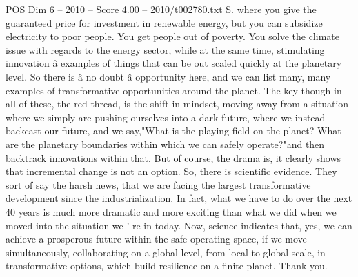 \begin{textsample}{POS Dim 6 – 2010 – Score 4.00 – 2010/t002780.txt}
S. where you give the guaranteed price for investment in renewable energy, but you can subsidize electricity to poor people.
You get people out of poverty.
You solve the climate issue with regards to the energy sector, while at the same time, stimulating innovation â examples of things that can be out scaled quickly at the planetary level.
So there is â no doubt â opportunity here, and we can list many, many examples of transformative opportunities around the planet.
The key though in all of these, the red thread, is the shift in mindset, moving away from a situation where we simply are pushing ourselves into a dark future, where we instead backcast our future, and we say,"What is the playing field on the planet?
What are the planetary boundaries within which we can safely operate?"and then backtrack innovations within that.
But of course, the drama is, it clearly shows that incremental change is not an option.
So, there is scientific evidence.
They sort of say the harsh news, that we are facing the largest transformative development since the industrialization.
In fact, what we have to do over the next 40 years is much more dramatic and more exciting than what we did when we moved into the situation we ' re in today.
Now, science indicates that, yes, we can achieve a prosperous future within the safe operating space, if we move simultaneously, collaborating on a global level, from local to global scale, in transformative options, which build resilience on a finite planet.
Thank you.

\end{textsample}
